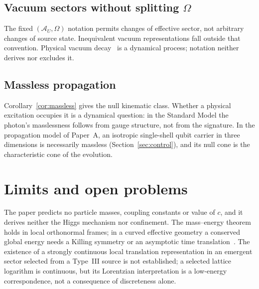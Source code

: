 \documentclass[12pt,a4paper]{article}
\theoremstyle{definition}
\theoremstyle{remark}
\newcommand{\AU}{\mathcal{A}_U}
\newcommand{\Omegastate}{\Omega}
\begin{document}
\subsection{Vacuum sectors without splitting \texorpdfstring{$\Omega$}{Omega}}
\label{sec:vacuum}

The fixed $(\AU,\Omegastate)$ notation permits changes of effective sector, not arbitrary changes of source state. Inequivalent vacuum representations fall outside that convention. Physical vacuum decay~\cite{Coleman1977,CallanColeman1977} is a dynamical process; notation neither derives nor excludes it.

\subsection{Massless propagation}

Corollary~\ref{cor:massless} gives the null kinematic class. Whether a physical excitation occupies it is a dynamical question: in the Standard Model the photon's masslessness follows from gauge structure, not from the signature. In the propagation model of Paper~A, an isotropic single-shell qubit carrier in three dimensions is necessarily massless (Section~\ref{sec:control}), and its null cone is the characteristic cone of the evolution.

\section{Limits and open problems}
\label{sec:limits}

The paper predicts no particle masses, coupling constants or value of $c$, and it derives neither the Higgs mechanism nor confinement. The mass--energy theorem holds in local orthonormal frames; in a curved effective geometry a conserved global energy needs a Killing symmetry or an asymptotic time translation~\cite{Wald1984}. The existence of a strongly continuous local translation representation in an emergent sector selected from a Type~III source is not established; a selected lattice logarithm is continuous, but its Lorentzian interpretation is a low-energy correspondence, not a consequence of discreteness alone.
\end{document}
